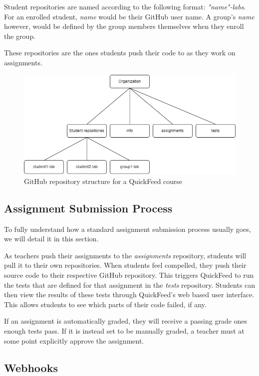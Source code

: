 Student repositories are named according to the following format: \textit{"name"-labs}.
For an enrolled student, \textit{name} would be their GitHub user name.
A group's \textit{name} however, would be defined by the group members themselves when they enroll the group.

These repositories are the ones students push their code to as they work on assignments.

\begin{figure}[ht]
    \centering
    \includegraphics[width=\textwidth]{photos/qf-repository-structure.png}
    \caption{GitHub repository structure for a QuickFeed course}
    \label{fig:qf-repository-structure}
\end{figure}

\subsection{Assignment Submission Process}

To fully understand how a standard assignment submission process usually goes, we will detail it in this section.

As teachers push their assignments to the \textit{assignments} repository, students will pull it to their own repositories.
When students feel compelled, they push their source code to their respective GitHub repository.
This triggers QuickFeed to run the tests that are defined for that assignment in the \textit{tests} repository.
Students can then view the results of these tests through QuickFeed's web based user interface.  
This allows students to see which parts of their code failed, if any.

If an assignment is automatically graded, they will receive a passing grade ones enough tests pass.
If it is instead set to be manually graded, a teacher must at some point explicitly approve the assignment.

\subsection{Webhooks}

